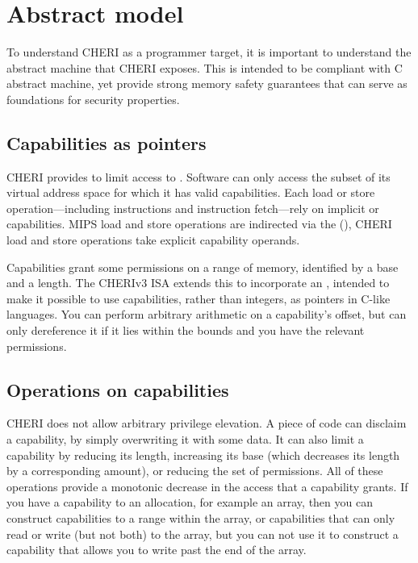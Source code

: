 \chapter{Abstract model}

To understand CHERI as a programmer target, it is important to understand the abstract machine that CHERI exposes.  This is intended to be compliant with C abstract machine, yet provide strong memory safety guarantees that can serve as foundations for security properties.

\section{Capabilities as pointers}

CHERI provides  to limit access to .  Software can only access the subset of its virtual address space for which it has valid capabilities.  Each load or store operation---including instructions and instruction fetch---rely on implicit or capabilities.  MIPS load and store operations are indirected via the  (), CHERI load and store operations take explicit capability operands.

Capabilities grant some permissions on a range of memory, identified by a base and a length.  The CHERIv3 ISA extends this to incorporate an , intended to make it possible to use capabilities, rather than integers, as pointers in C-like languages.  You can perform arbitrary arithmetic on a capability's offset, but can only dereference it if it lies within the bounds and you have the relevant permissions.

\section{Operations on capabilities}

CHERI does not allow arbitrary privilege elevation.  A piece of code can disclaim a capability, by simply overwriting it with some data.  It can also limit a capability by reducing its length, increasing its base (which decreases its length by a corresponding amount), or reducing the set of permissions.  All of these operations provide a monotonic decrease in the access that a capability grants.  If you have a capability to an allocation, for example an array, then you can construct capabilities to a range within the array, or capabilities that can only read or write (but not both) to the array, but you can not use it to construct a capability that allows you to write past the end of the array.

